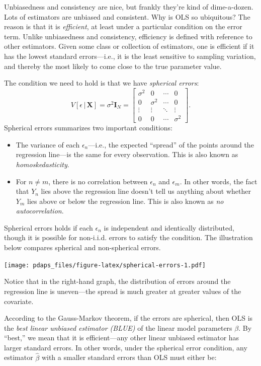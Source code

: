 \documentclass[
  12pt,
  oneside,openany]{book}
\begin{document}
Unbiasedness and consistency are nice, but frankly they're kind of dime-a-dozen. Lots of estimators are unbiased and consistent. Why is OLS so ubiquitous? The reason is that it is \emph{efficient}, at least under a particular condition on the error term. Unlike unbiasedness and consistency, efficiency is defined with reference to other estimators. Given some class or collection of estimators, one is efficient if it has the lowest standard errors---i.e., it is the least sensitive to sampling variation, and thereby the most likely to come close to the true parameter value.

The condition we need to hold is that we have \emph{spherical errors}:
\[
V[\epsilon \,|\, \mathbf{X}] = \sigma^2 \mathbf{I}_N
= \begin{bmatrix}
  \sigma^2 & 0 & \cdots & 0 \\
  0 & \sigma^2 & \cdots & 0 \\
  \vdots & \vdots & \ddots & \vdots \\
  0 & 0 & \cdots & \sigma^2
\end{bmatrix}.
\]
Spherical errors summarizes two important conditions:

\begin{itemize}
\item
  The variance of each \(\epsilon_n\)---i.e., the expected ``spread'' of the points around the regression line---is the same for every observation. This is also known as \emph{homoskedasticity}.
\item
  For \(n \neq m\), there is no correlation between \(\epsilon_n\) and \(\epsilon_m\). In other words, the fact that \(Y_n\) lies above the regression line doesn't tell us anything about whether \(Y_m\) lies above or below the regression line. This is also known as \emph{no autocorrelation}.
\end{itemize}

Spherical errors holds if each \(\epsilon_n\) is independent and identically distributed, though it is possible for non-i.i.d. errors to satisfy the condition. The illustration below compares spherical and non-spherical errors.

\texttt{[image: pdaps\_files/figure-latex/spherical-errors-1.pdf]}

Notice that in the right-hand graph, the distribution of errors around the regression line is uneven---the spread is much greater at greater values of the covariate.

According to the Gauss-Markov theorem, if the errors are spherical, then OLS is the \emph{best linear unbiased estimator (BLUE)} of the linear model parameters \(\beta\). By ``best,'' we mean that it is efficient---any other linear unbiased estimator has larger standard errors. In other words, under the spherical error condition, any estimator \(\hat{\beta}\) with a smaller standard errors than OLS must either be:
\end{document}
